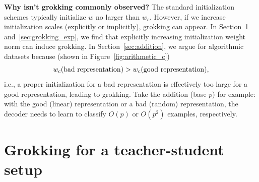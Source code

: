 \documentclass{article} %
\newcommand{\zm}[1]{{\color{black!100!blue} #1}}
\begin{document}
{\bf Why isn't grokking commonly observed?} The standard initialization schemes typically initialize $w$ no larger than $w_c$. However, if we increase initialization scales (explicitly or implicitly), grokking can appear. In Section~\ref{sec:teacher-student} and~\ref{sec:grokking_exp}, we find that explicitly increasing initialization weight norm can induce grokking. \zm{In Section~\ref{sec:addition}, we argue for algorithmic datasets because (shown in Figure~\ref{fig:arithmetic_c})}
\begin{equation}
    w_c({\rm bad\ representation})>w_c({\rm good\ representation}),
\end{equation}
\zm{i.e., a proper initialization for a bad representation is effectively too large for a good representation, leading to grokking. Take the addition (base $p$) for example: with the good (linear) representation or a bad (random) representation, the decoder needs to learn to classify $O(p)$ or $O(p^2)$ examples, respectively.}




\section{Grokking for a teacher-student setup}\label{sec:teacher-student}
\end{document}
